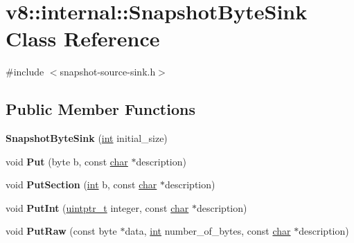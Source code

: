 \hypertarget{classv8_1_1internal_1_1SnapshotByteSink}{}\section{v8\+:\+:internal\+:\+:Snapshot\+Byte\+Sink Class Reference}
\label{classv8_1_1internal_1_1SnapshotByteSink}


{\ttfamily \#include $<$snapshot-\/source-\/sink.\+h$>$}

\subsection*{Public Member Functions}
\begin{DoxyCompactItemize}
\item 
\mbox{\label{classv8_1_1internal_1_1SnapshotByteSink_a44df6d4e0e2bae9808e24e632d4a0c3e}} 
{\bfseries Snapshot\+Byte\+Sink} (\mbox{\hyperlink{classint}{int}} initial\+\_\+size)
\item 
\mbox{\label{classv8_1_1internal_1_1SnapshotByteSink_adb1c096459811acb6a84d9cacdcad885}} 
void {\bfseries Put} (byte b, const \mbox{\hyperlink{classchar}{char}} $\ast$description)
\item 
\mbox{\label{classv8_1_1internal_1_1SnapshotByteSink_ad3461ff445a9e50130d967f57affc905}} 
void {\bfseries Put\+Section} (\mbox{\hyperlink{classint}{int}} b, const \mbox{\hyperlink{classchar}{char}} $\ast$description)
\item 
\mbox{\label{classv8_1_1internal_1_1SnapshotByteSink_a99f6f87ab81c173335c6525eeec718b8}} 
void {\bfseries Put\+Int} (\mbox{\hyperlink{classuintptr__t}{uintptr\+\_\+t}} integer, const \mbox{\hyperlink{classchar}{char}} $\ast$description)
\item 
\mbox{\label{classv8_1_1internal_1_1SnapshotByteSink_ad24beddfd60dd9760ac8895cdb7f7904}} 
void {\bfseries Put\+Raw} (const byte $\ast$data, \mbox{\hyperlink{classint}{int}} number\+\_\+of\+\_\+bytes, const \mbox{\hyperlink{classchar}{char}} $\ast$description)
\item 

\end{DoxyCompactItemize}
